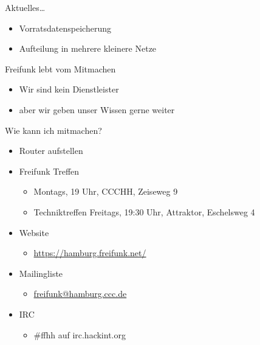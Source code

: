 \documentclass[t]{beamer}
\begin{document}
  \begin{frame}{Aktuelles\ldots}
    \begin{itemize}
      \item Vorratsdatenspeicherung
      \item Aufteilung in mehrere kleinere Netze
    \end{itemize}
  \end{frame}
  
  \begin{frame}{Freifunk lebt vom Mitmachen}
    \begin{itemize}
      \item Wir sind kein Dienstleister
      \item aber wir geben unser Wissen gerne weiter
    \end{itemize}
  \end{frame}
  
  \begin{frame}{Wie kann ich mitmachen?}
    \begin{itemize}
      \item Router aufstellen
      \item Freifunk Treffen
      \begin{itemize}
       \item Montags, 19 Uhr, CCCHH, Zeiseweg 9
       \item Techniktreffen Freitags, 19:30 Uhr, Attraktor, Eschelsweg 4
      \end{itemize}
      \item Website
      \begin{itemize}
       \item \href{https://hamburg.freifunk.net/}{https://hamburg.freifunk.net/}
      \end{itemize}
      \item Mailingliste
      \begin{itemize}
       \item \href{mailto:freifunk@hamburg.ccc.de}{freifunk@hamburg.ccc.de}
      \end{itemize}
      \item IRC
      \begin{itemize}
       \item \#ffhh auf irc.hackint.org
      \end{itemize}
    \end{itemize}
  \end{frame}
  
\end{document}
